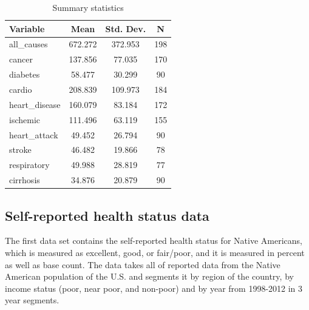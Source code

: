 \documentclass[12pt]{article}
\begin{document}
\begin{table}[htbp]\centering \caption{Summary statistics \label{sumstat}}
\begin{tabular}{ | l || c | c | c |}\hline\hline
\textbf{Variable} & \textbf{Mean} & \textbf{Std. Dev.} & \textbf{N} \\\hline
all\_causes & 672.272 & 372.953  & 198\\\hline
cancer & 137.856 & 77.035  & 170\\\hline
diabetes & 58.477 & 30.299  & 90\\\hline
cardio & 208.839 & 109.973  & 184\\\hline
heart\_disease & 160.079 & 83.184  & 172\\\hline
ischemic & 111.496 & 63.119  & 155\\\hline
heart\_attack & 49.452 & 26.794  & 90\\\hline
stroke & 46.482 & 19.866  & 78\\\hline
respiratory & 49.988 & 28.819  & 77\\\hline
cirrhosis & 34.876 & 20.879  & 90\\
\hline
\end{tabular}
\end{table}


\subsection{Self-reported health status data}
The first data set contains the self-reported health status for Native Americans, which is measured as excellent, good, or fair/poor, and it is measured in percent as well as base count.
The data takes all of reported data from the Native American population of the U.S. and segments it by region of the country, by income status (poor, near poor, and non-poor) and by year from 1998-2012 in 3 year segments.
\end{document}

